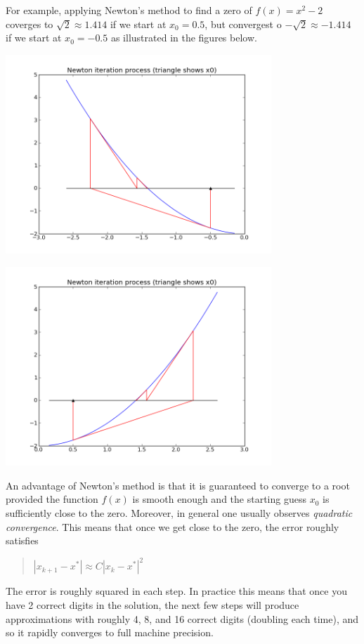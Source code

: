 \documentclass[letterpaper,10pt,english]{sphinxmanual}
\begin{document}
For example, applying Newton's method to find a zero of $f(x) = x^2-2$
coverges to $\sqrt{2} \approx 1.414$ if we start at $x_0=0.5$,
but convergest o $-\sqrt{2} \approx -1.414$ if we start at
$x_0=-0.5$ as illustrated in the figures below.

\includegraphics[width=10cm]{newtonsqrt2m.png}

\includegraphics[width=10cm]{newtonsqrt2.png}

An advantage of Newton's method is that it is guaranteed to converge to a
root provided the function $f(x)$ is smooth enough and the starting
guess $x_0$ is sufficiently close to the zero.  Moreover, in general
one usually observes \emph{quadratic convergence}.  This means that once we get
close to the zero, the error roughly satisfies
\begin{quote}

$|x_{k+1} - x^*| \approx C|x_k-x^*|^2$
\end{quote}

The error is roughly squared in each step.  In practice this means that once
you have 2 correct digits in the solution, the next few steps will produce
approximations with roughly 4, 8, and 16 correct digits (doubling each
time), and so it rapidly converges to full machine precision.
\end{document}
